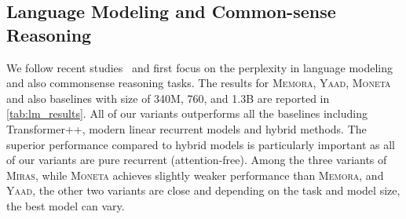 \documentclass{article}
\newcommand{\citep}{\parencite}
\newcommand{\framework}[0]{\textsc{Miras}}
\newcommand{\ymodel}[0]{\textsc{Yaad}}
\newcommand{\mmodel}[0]{\textsc{Moneta}}
\newcommand{\xmodel}[0]{\textsc{Memora}}
\theoremstyle{plain}
\theoremstyle{definition}
\theoremstyle{remark}
\begin{document}
\subsection{Language Modeling and Common-sense Reasoning}
We follow recent studies~\citep{yang2024gated, yang2024parallelizing, behrouz2024titans} and first focus on the perplexity in language modeling and also commonsense reasoning tasks. The results for \xmodel, \ymodel, \mmodel{} and also baselines with size of 340M, 760, and 1.3B are reported in \autoref{tab:lm_results}. All of our variants outperforms all the baselines including Transformer++, modern linear recurrent models and hybrid methods. The superior performance compared to hybrid models is particularly important as all of our variants are pure recurrent (attention-free). Among the three variants of \framework, while \mmodel{} achieves slightly weaker performance than \xmodel, and \ymodel, the other two variants are close and depending on the task and model size, the best model can vary.
\end{document}
